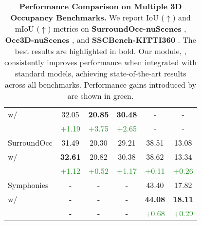\begin{table}
{\begin{tabular}{@{}l c c c c c@{}}
        \rowcolor{Apricot!20!}
        \quad w/ \method{} & 32.05 & \textbf{20.85} & \textbf{30.48} &  - & - \\

        & \textcolor{ForestGreen}{+1.19} & \textcolor{ForestGreen}{+3.75} & \textcolor{ForestGreen}{+2.65} & - & - \\

        \midrule

        SurroundOcc \cite{wei2023surroundocc} & 31.49 & 20.30 & 29.21 & 38.51 & 13.08 \\

        \rowcolor{Apricot!20!}
        \quad w/ \method{} & \textbf{32.61} &  20.82 &  30.38 &  38.62 & 13.34 \\
        & \textcolor{ForestGreen}{+1.12} & \textcolor{ForestGreen}{+0.52} & \textcolor{ForestGreen}{+1.17} &  \textcolor{ForestGreen}{+0.11} & \textcolor{ForestGreen}{+0.26} \\

        \midrule
        Symphonies \citep{jiang2024symphonies} & - & - & - & 43.40 & 17.82 \\
        \rowcolor{Apricot!20!}
        \quad w/ \method{} & - & - & - & \textbf{44.08} & \textbf{18.11} \\
         & - & - & - & \textcolor{ForestGreen}{+0.68} & \textcolor{ForestGreen}{+0.29} \\
        \bottomrule
    \end{tabular}}
    \caption{\textbf{Performance Comparison on Multiple 3D Occupancy Benchmarks.} We report IoU ($\uparrow$) and mIoU ($\uparrow$) metrics on \textbf{SurroundOcc-nuScenes} \citep{wei2023surroundocc}, \textbf{Occ3D-nuScenes} \citep{tian2023occ3d}, and \textbf{SSCBench-KITTI360} \citep{li2024sscbench}. The best results are highlighted in bold. Our module, \method{}, consistently improves performance when integrated with standard models, achieving state-of-the-art results across all benchmarks. Performance gains introduced by \method{} are shown in green.}
    \label{tab:unified_benchmark}
\end{table}



        

        
        


